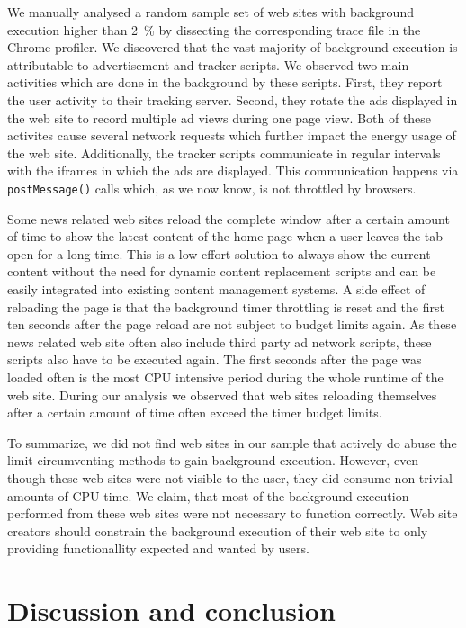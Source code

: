 \documentclass[
	ruledheaders=section,%
	class=report,%
	thesis={type=bachelor},%
	accentcolor=9c,%
	custommargins=true,%
	marginpar=false,%
	parskip=half-,%
	fontsize=11pt,%
]{tudapub}
\begin{document}
  We manually analysed a random sample set of web sites with background execution higher than 2~\% by dissecting the corresponding trace file in the Chrome profiler. We discovered that the vast majority of background execution is attributable to advertisement and tracker scripts. We observed two main activities which are done in the background by these scripts. First, they report the user activity to their tracking server. Second, they rotate the ads displayed in the web site to record multiple ad views during one page view. Both of these activites cause several network requests which further impact the energy usage of the web site. Additionally, the tracker scripts communicate in regular intervals with the iframes in which the ads are displayed. This communication happens via \texttt{postMessage()} calls which, as we now know, is not throttled by browsers.
  
  Some news related web sites reload the complete window after a certain amount of time to show the latest content of the home page when a user leaves the tab open for a long time. This is a low effort solution to always show the current content without the need for dynamic content replacement scripts and can be easily integrated into existing content management systems. A side effect of reloading the page is that the background timer throttling is reset and the first ten seconds after the page reload are not subject to budget limits again. As these news related web site often also include third party ad network scripts, these scripts also have to be executed again. The first seconds after the page was loaded often is the most CPU intensive period during the whole runtime of the web site. During our analysis we observed that web sites reloading themselves after a certain amount of time often exceed the timer budget limits.
  
  To summarize, we did not find web sites in our sample that actively do abuse the limit circumventing methods to gain background execution. However, even though these web sites were not visible to the user, they did consume non trivial amounts of CPU time. We claim, that most of the background execution performed from these web sites were not necessary to function correctly. Web site creators should constrain the background execution of their web site to only providing functionallity expected and wanted by users.

  
  \newpage
  \chapter{Discussion and conclusion}
\end{document}
